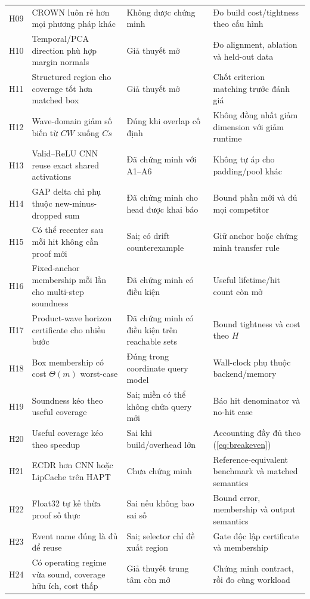 \documentclass[11pt,a4paper]{article}
\theoremstyle{remark}
\begin{document}
\begin{longtable}{@{}p{0.8cm}p{4.0cm}p{4.3cm}p{3.9cm}@{}}
H09 & CROWN luôn rẻ hơn mọi phương pháp khác & Không được chứng minh
& Đo build cost/tightness theo cấu hình\\
H10 & Temporal/PCA direction phù hợp margin normals & Giả thuyết mở
& Đo alignment, ablation và held-out data\\
H11 & Structured region cho coverage tốt hơn matched box & Giả thuyết mở
& Chốt criterion matching trước đánh giá\\
H12 & Wave-domain giảm số biến từ $CW$ xuống $Cs$ & Đúng khi overlap cố định
& Không đồng nhất giảm dimension với giảm runtime\\
H13 & Valid--ReLU CNN reuse exact shared activations & Đã chứng minh với A1--A6
& Không tự áp cho padding/pool khác\\
H14 & GAP delta chỉ phụ thuộc new-minus-dropped sum & Đã chứng minh cho head
được khai báo & Bound phần mới và đủ mọi competitor\\
H15 & Có thể recenter sau mỗi hit không cần proof mới & Sai; có drift
counterexample & Giữ anchor hoặc chứng minh transfer rule\\
H16 & Fixed-anchor membership mỗi lần cho multi-step soundness & Đã chứng minh
có điều kiện & Useful lifetime/hit count còn mở\\
H17 & Product-wave horizon certificate cho nhiều bước & Đã chứng minh có điều
kiện trên reachable sets & Bound tightness và cost theo $H$\\
H18 & Box membership có cost $\Theta(m)$ worst-case & Đúng trong coordinate
query model & Wall-clock phụ thuộc backend/memory\\
H19 & Soundness kéo theo useful coverage & Sai; miền có thể không chứa query
mới & Báo hit denominator và no-hit case\\
H20 & Useful coverage kéo theo speedup & Sai khi build/overhead lớn
& Accounting đầy đủ theo (\ref{eq:breakeven})\\
H21 & ECDR hơn CNN hoặc LipCache trên HAPT & Chưa chứng minh
& Reference-equivalent benchmark và matched semantics\\
H22 & Float32 tự kế thừa proof số thực & Sai nếu không bao sai số
& Bound error, membership và output semantics\\
H23 & Event name đúng là đủ để reuse & Sai; selector chỉ đề xuất region
& Gate độc lập certificate và membership\\
H24 & Có operating regime vừa sound, coverage hữu ích, cost thấp & Giả thuyết
trung tâm còn mở & Chứng minh contract, rồi đo cùng workload\\\bottomrule
\end{longtable}
\end{document}
